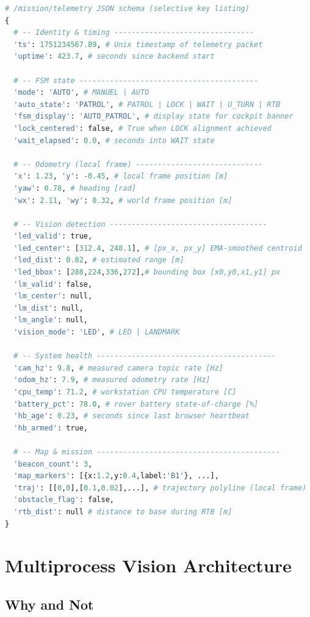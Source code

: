 \begin{lstlisting}[language=Python, caption={Selective telemetry JSON schema (key groups)}, label={lst:telemetry-schema}]
# /mission/telemetry JSON schema (selective key listing)
{
  # -- Identity & timing --------------------------------
  'ts': 1751234567.89, # Unix timestamp of telemetry packet
  'uptime': 423.7, # seconds since backend start

  # -- FSM state -----------------------------------------
  'mode': 'AUTO', # MANUEL | AUTO
  'auto_state': 'PATROL', # PATROL | LOCK | WAIT | U_TURN | RTB
  'fsm_display': 'AUTO_PATROL', # display state for cockpit banner
  'lock_centered': false, # True when LOCK alignment achieved
  'wait_elapsed': 0.0, # seconds into WAIT state

  # -- Odometry (local frame) -----------------------------
  'x': 1.23, 'y': -0.45, # local frame position [m]
  'yaw': 0.78, # heading [rad]
  'wx': 2.11, 'wy': 0.32, # world frame position [m]

  # -- Vision detection ------------------------------------
  'led_valid': true,
  'led_center': [312.4, 248.1], # [px_x, px_y] EMA-smoothed centroid
  'led_dist': 0.82, # estimated range [m]
  'led_bbox': [288,224,336,272],# bounding box [x0,y0,x1,y1] px
  'lm_valid': false,
  'lm_center': null,
  'lm_dist': null,
  'lm_angle': null,
  'vision_mode': 'LED', # LED | LANDMARK

  # -- System health -----------------------------------------
  'cam_hz': 9.8, # measured camera topic rate [Hz]
  'odom_hz': 7.9, # measured odometry rate [Hz]
  'cpu_temp': 71.2, # workstation CPU temperature [C]
  'battery_pct': 78.0, # rover battery state-of-charge [%]
  'hb_age': 0.23, # seconds since last browser heartbeat
  'hb_armed': true,

  # -- Map & mission ------------------------------------------
  'beacon_count': 3,
  'map_markers': [{x:1.2,y:0.4,label:'B1'}, ...],
  'traj': [[0,0],[0.1,0.02],...], # trajectory polyline (local frame)
  'obstacle_flag': false,
  'rtb_dist': null # distance to base during RTB [m]
}
\end{lstlisting}

\section{Multiprocess Vision Architecture}

\subsection{Why  and Not }


